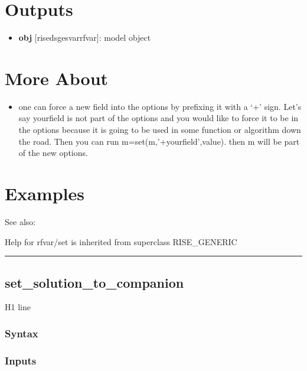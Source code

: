 \documentclass[letterpaper,10pt,english]{sphinxmanual}
\begin{document}
\section{Outputs}
\label{classes/models/@rfvar/rfvar:id107}\begin{itemize}
\item {} 
\textbf{obj} {[}rise\textbar{}dsge\textbar{}svar\textbar{}rfvar{]}: model object

\end{itemize}


\section{More About}
\label{classes/models/@rfvar/rfvar:id108}\begin{itemize}
\item {} 
one can force a new field into the options by prefixing it with a `+'
sign. Let's say yourfield is not part of the options and you would like
to force it to be in the options because it is going to be used in some
function or algorithm down the road. Then you can run
m=set(m,'+yourfield',value). then m will be part of the new options.

\end{itemize}


\section{Examples}
\label{classes/models/@rfvar/rfvar:id109}
See also:

Help for rfvar/set is inherited from superclass RISE\_GENERIC


\bigskip\hrule{}\bigskip



\subsection{set\_solution\_to\_companion}
\label{classes/models/@rfvar/rfvar:id110}\label{classes/models/@rfvar/rfvar:set-solution-to-companion}
H1 line


\subsubsection{Syntax}
\label{classes/models/@rfvar/rfvar:id111}

\subsubsection{Inputs}
\label{classes/models/@rfvar/rfvar:id112}
\end{document}
